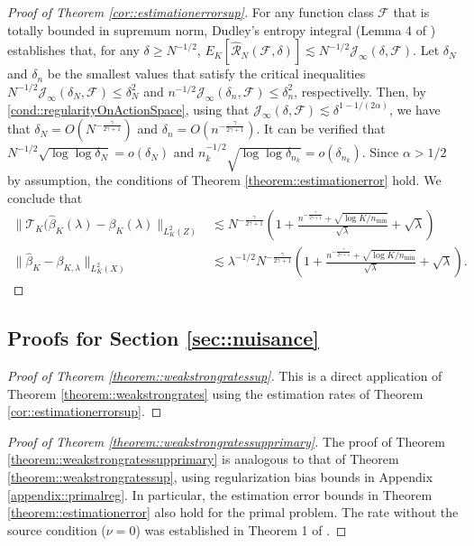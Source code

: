 \documentclass[11pt]{article}
\theoremstyle{plain}
\theoremstyle{definition}
\theoremstyle{remark}
\theoremstyle{definition}
\begin{document}
\begin{proof}[Proof of Theorem \ref{cor::estimationerrorsup}]
    For any function class $\mathcal{F}$ that is totally bounded in supremum norm, Dudley's entropy integral (Lemma 4 of \cite{van2024combining}) establishes that, for any $\delta \geq N^{-1/2}$,
    $E_K[\widehat{\mathcal{R}}_N(\mathcal{F}, \delta)] \lesssim N^{-1/2}\mathcal{J}_{\infty}(\delta, \mathcal{F})$. Let $\delta_N$ and $\delta_n$ be the smallest values that satisfy the critical inequalities  $N^{-1/2}\mathcal{J}_{\infty}(\delta_N, \mathcal{F}) \leq \delta_N^2$ and $n^{-1/2}\mathcal{J}_{\infty}(\delta_n, \mathcal{F}) \leq \delta_n^2$, respectivelly. Then, by \ref{cond::regularityOnActionSpace}, using that $\mathcal{J}_{\infty}(\delta, \mathcal{F}) \lesssim \delta^{1-1/(2\alpha)}$, we have that $\delta_N = O(N^{-\frac{\gamma}{2\gamma+1}})$ and $\delta_n = O(n^{-\frac{\gamma}{2\gamma+1}})$. It can be verified that $ N^{-1/2} \sqrt{\log \log \delta_{N}} =  o(\delta_{N})$ and $ n_k^{-1/2} \sqrt{\log \log \delta_{n_k}} =  o(\delta_{n_k})$. Since $\alpha > 1/2$ by assumption, the conditions of Theorem \ref{theorem::estimationerror} hold. We conclude that
    \begin{align*}
\|\mathcal{T}_{K}(\widehat{\beta}_K(\lambda)-\beta_{K}(\lambda)\|_{L^2_K(Z)}& \lesssim N^{-\frac{\gamma}{2\gamma+1}} \left( 1 + \frac{n^{-\frac{\gamma}{2\gamma+1}} + \sqrt{\log K / n_{\min}}}{\sqrt{\lambda}}  + \sqrt{\lambda} \right)\\
\|\widehat{\beta}_K-\beta_{K,\lambda}\|_{L^2_K(X)} &\lesssim  \lambda^{-1/2} N^{-\frac{\gamma}{2\gamma+1}} \left( 1 + \frac{n^{-\frac{\gamma}{2\gamma+1}} + \sqrt{ \log K / n_{\min}}}{\sqrt{\lambda}}  + \sqrt{\lambda} \right).
\end{align*} 
    
\end{proof}

\subsection{Proofs for Section \ref{sec::nuisance}}

\begin{proof}[Proof of Theorem \ref{theorem::weakstrongratessup}]
    This is a direct application of Theorem \ref{theorem::weakstrongrates} using the estimation rates of Theorem \ref{cor::estimationerrorsup}. 
\end{proof}


\begin{proof}[Proof of Theorem \ref{theorem::weakstrongratessupprimary}]
The proof of Theorem \ref{theorem::weakstrongratessupprimary} is analogous to that of Theorem \ref{theorem::weakstrongratessup}, using regularization bias bounds in Appendix \ref{appendix::primalreg}. In particular, the estimation error bounds in Theorem \ref{theorem::estimationerror} also hold for the primal problem. The rate without the source condition (\(\nu = 0\)) was established in Theorem 1 of \cite{bibaut2024nonparametric}.  
\end{proof}
\end{document}
